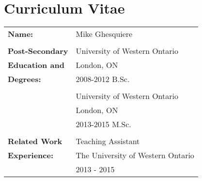 \documentclass[12pt,twoside]{report}
\numberwithin{figure}{chapter}
\newcommand{\firstname}{Mike}
\newcommand{\lastname}{Ghesquiere}
\begin{document}









{}

\begin{appendices}

\end{appendices}

\chapter*{Curriculum Vitae}
\begin{table}[ht]
\begin{tabular}{ll}
\textbf{Name:} & \firstname{} \lastname\\\\
\textbf{Post-Secondary} & University of Western Ontario\\
\textbf{Education and}& London, ON\\
\textbf{Degrees:}& 2008-2012 B.Sc.\\\\
& University of Western Ontario\\
& London, ON\\
& 2013-2015 M.Sc.\\\\
\textbf{Related Work}& Teaching Assistant\\
\textbf{Experience:}& The University of Western Ontario\\
& 2013 - 2015\\
\end{tabular}
\end{table}
\end{document}
